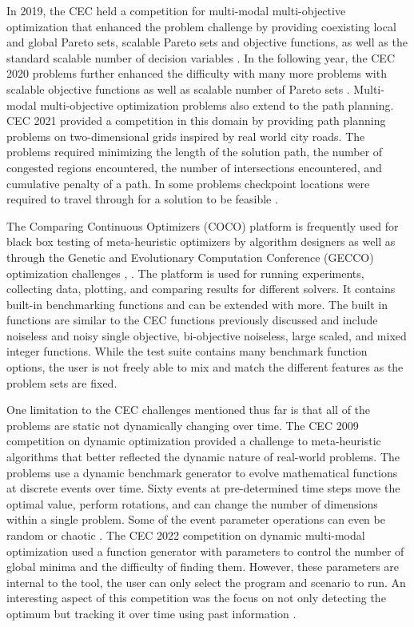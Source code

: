 \documentclass[a4paper]{article}
\begin{document}
In 2019, the CEC held a competition for multi-modal multi-objective optimization that enhanced the problem challenge by providing coexisting local and global Pareto sets, scalable Pareto sets and objective functions, as well as the standard scalable number of decision variables \cite{liang_problem_2019}. In the following year, the CEC 2020 problems further enhanced the difficulty with many more problems with scalable objective functions as well as scalable number of Pareto sets \cite{liang_problem_2019-1}. Multi-modal multi-objective optimization problems also extend to the path planning. CEC 2021 provided a competition in this domain by providing path planning problems on two-dimensional grids inspired by real world city roads. The problems required minimizing the length of the solution path, the number of congested regions encountered, the number of intersections encountered, and cumulative penalty of a path. In some problems checkpoint locations were required to travel through for a solution to be feasible \cite{liang_problem_2020}.

The Comparing Continuous Optimizers (COCO) platform \cite{hansen_coco_2021} is frequently used for black box testing of meta-heuristic optimizers by algorithm designers as well as through the Genetic and Evolutionary Computation Conference (GECCO) optimization challenges \cite{noauthor_bbob_nodate}, \cite{sharma_metaheuristic_2023}. The platform is used for running experiments, collecting data, plotting, and comparing results for different solvers. It contains built-in benchmarking functions and can be extended with more. The built in functions are similar to the CEC functions previously discussed and include noiseless and noisy single objective, bi-objective noiseless, large scaled, and mixed integer functions. While the test suite contains many benchmark function options, the user is not freely able to mix and match the different features as the problem sets are fixed.


One limitation to the CEC challenges mentioned thus far is that all of the problems are static not dynamically changing over time. The CEC 2009 competition on dynamic optimization provided a challenge to meta-heuristic algorithms that better reflected the dynamic nature of real-world problems. The problems use a dynamic benchmark generator to evolve mathematical functions at discrete events over time. Sixty events at pre-determined time steps move the optimal value, perform rotations, and can change the number of dimensions within a single problem. Some of the event parameter operations can even be random or chaotic \cite{li_benchmark_2008}. The CEC 2022 competition on dynamic multi-modal optimization used a function generator with parameters to control the number of global minima and the difficulty of finding them. However, these parameters are internal to the tool, the user can only select the program and scenario to run. An interesting aspect of this competition was the focus on not only detecting the optimum but tracking it over time using past information \cite{ahrari_problem_2022}.
\end{document}
